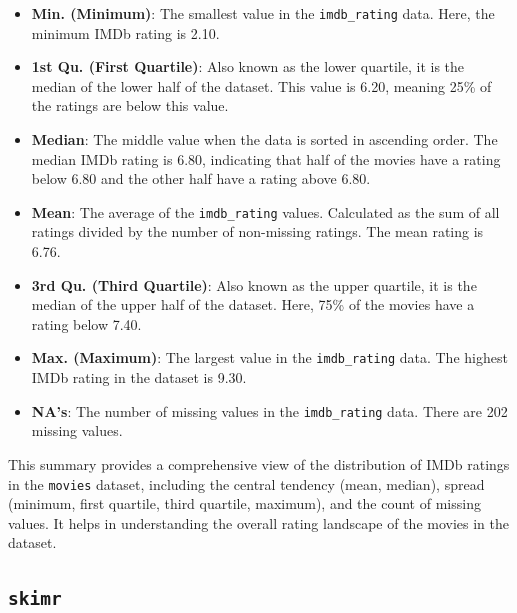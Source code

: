 \documentclass[
]{book}
\newenvironment{Shaded}{\begin{snugshade}}{\end{snugshade}}
\newcommand{\FunctionTok}[1]{\textcolor[rgb]{0.13,0.29,0.53}{\textbf{#1}}}
\newcommand{\NormalTok}[1]{#1}
\newcommand{\SpecialCharTok}[1]{\textcolor[rgb]{0.81,0.36,0.00}{\textbf{#1}}}
\providecommand{\tightlist}{%
  \setlength{\itemsep}{0pt}\setlength{\parskip}{0pt}}
\begin{document}
\begin{Shaded}
\end{Shaded}

\begin{itemize}
\tightlist
\item
  \textbf{Min. (Minimum)}: The smallest value in the \texttt{imdb\_rating} data. Here, the minimum IMDb rating is 2.10.
\item
  \textbf{1st Qu. (First Quartile)}: Also known as the lower quartile, it is the median of the lower half of the dataset. This value is 6.20, meaning 25\% of the ratings are below this value.
\item
  \textbf{Median}: The middle value when the data is sorted in ascending order. The median IMDb rating is 6.80, indicating that half of the movies have a rating below 6.80 and the other half have a rating above 6.80.
\item
  \textbf{Mean}: The average of the \texttt{imdb\_rating} values. Calculated as the sum of all ratings divided by the number of non-missing ratings. The mean rating is 6.76.
\item
  \textbf{3rd Qu. (Third Quartile)}: Also known as the upper quartile, it is the median of the upper half of the dataset. Here, 75\% of the movies have a rating below 7.40.
\item
  \textbf{Max. (Maximum)}: The largest value in the \texttt{imdb\_rating} data. The highest IMDb rating in the dataset is 9.30.
\item
  \textbf{NA's}: The number of missing values in the \texttt{imdb\_rating} data. There are 202 missing values.
\end{itemize}

This summary provides a comprehensive view of the distribution of IMDb ratings in the \texttt{movies} dataset, including the central tendency (mean, median), spread (minimum, first quartile, third quartile, maximum), and the count of missing values. It helps in understanding the overall rating landscape of the movies in the dataset.

\subsection*{\texorpdfstring{\texttt{skimr}}{skimr}}\label{skimr}
\end{document}
